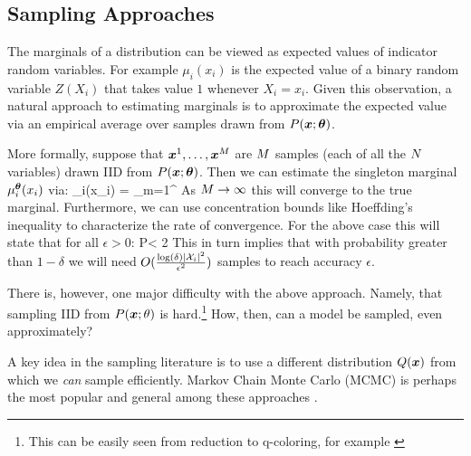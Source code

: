 \subsection{Sampling Approaches}
\label{sec:sampling}
The marginals of a distribution can be viewed as expected values of indicator random variables. For example $\mu_i(x_i)$ is the expected value of a binary
random variable $Z(X_i)$ that takes value $1$ whenever $X_i=x_i$. Given this observation, a natural approach to estimating marginals is to approximate the expected value via an empirical average over samples drawn from $P(\boldsymbol{x};\boldsymbol{\theta})$. 

More formally, suppose that $\boldsymbol{x}^{1},\ldots,\boldsymbol{x}^{M}$ are $M$ samples (each of all the $N$ variables) drawn IID from $P(\boldsymbol{x};\boldsymbol{\theta})$. Then we can estimate the singleton marginal $\mu^{\boldsymbol{\theta}}_i(x_i)$ via:
\be
\hat{\mu}_i(x_i) = \sum_{m=1}^{\nsamples} 
\ee
As $M \to \infty$ this will converge to the true marginal. Furthermore, we can use concentration bounds like Hoeffding's inequality to characterize the rate of convergence. For the above case this will state that for all $\epsilon > 0$:
\be
P < 2
\ee
This in turn implies that with probability greater than $1-\delta$ we will need $O(\frac{\log(\delta) |{\cal X}_i|^2}{\epsilon^2})$ samples to reach accuracy $\epsilon$.

There is, however, one major difficulty with the above approach.
Namely, that sampling IID from $P(\boldsymbol{x};\theta)$ is hard.\footnote{This can be easily seen from reduction to q-coloring, for example \cite{levin2009markov, bordewich2016mixing}}
How, then, can a model be sampled, even approximately?

A key idea in the sampling literature is to use a different distribution $Q(\boldsymbol{x})$ from which we {\em can} sample efficiently. 
Markov Chain Monte Carlo (MCMC) is perhaps the most popular and general among these approaches \cite{andrieu2003introduction,levin2009markov}.

